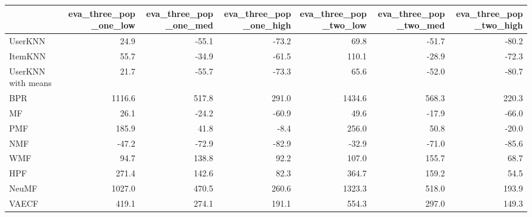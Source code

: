 \begin{tabular}{lrrrrrr}
\toprule
{} &  eva\_three\_pop\_one\_low &  eva\_three\_pop\_one\_med &  eva\_three\_pop\_one\_high &  eva\_three\_pop\_two\_low &  eva\_three\_pop\_two\_med &  eva\_three\_pop\_two\_high \\
\midrule
UserKNN            &                   24.9 &                  -55.1 &                   -73.2 &                   69.8 &                  -51.7 &                   -80.2 \\
ItemKNN            &                   55.7 &                  -34.9 &                   -61.5 &                  110.1 &                  -28.9 &                   -72.3 \\
UserKNN with means &                   21.7 &                  -55.7 &                   -73.3 &                   65.6 &                  -52.0 &                   -80.7 \\
BPR                &                 1116.6 &                  517.8 &                   291.0 &                 1434.6 &                  568.3 &                   220.3 \\
MF                 &                   26.1 &                  -24.2 &                   -60.9 &                   49.6 &                  -17.9 &                   -66.0 \\
PMF                &                  185.9 &                   41.8 &                    -8.4 &                  256.0 &                   50.8 &                   -20.0 \\
NMF                &                  -47.2 &                  -72.9 &                   -82.9 &                  -32.9 &                  -71.0 &                   -85.6 \\
WMF                &                   94.7 &                  138.8 &                    92.2 &                  107.0 &                  155.7 &                    68.7 \\
HPF                &                  271.4 &                  142.6 &                    82.3 &                  364.7 &                  159.2 &                    54.5 \\
NeuMF              &                 1027.0 &                  470.5 &                   260.6 &                 1323.3 &                  518.0 &                   193.9 \\
VAECF              &                  419.1 &                  274.1 &                   191.1 &                  554.3 &                  297.0 &                   149.3 \\
\bottomrule
\end{tabular}
